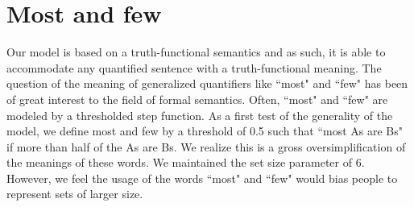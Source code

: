 \documentclass[10pt,letterpaper]{article}
\begin{document}
%
%
%

%
%

\section{Most and few}

Our model is based on a truth-functional semantics and as such, it is able to accommodate any quantified sentence with a truth-functional meaning. The question of the meaning of generalized quantifiers like ``most" and ``few" has been of great interest to the field of formal semantics. Often, ``most" and ``few" are modeled by a thresholded step function. As a first test of the generality of the model, we define most and few by a threshold of 0.5 such that ``most As are Bs" if more than half of the As are Bs. We realize this is a gross oversimplification of the meanings of these words. We maintained the set size parameter of 6. However, we feel the usage of the words ``most" and ``few" would bias people to represent sets of larger size.
\end{document}
